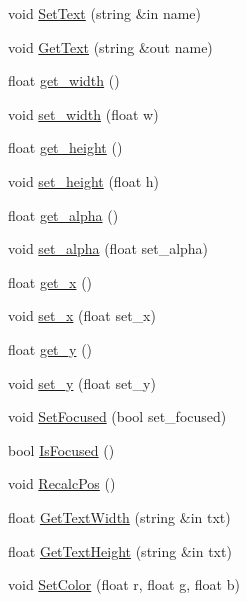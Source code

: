 \begin{DoxyCompactItemize}
\item 
void \hyperlink{class_g_u_i_calendar_a0a48b35472a2d11647c7276c0a759d38}{Set\+Text} (string \&in name)
\item 
void \hyperlink{class_g_u_i_calendar_aca1da814cb8b7bb1127e59122b2ccca1}{Get\+Text} (string \&out name)
\item 
float \hyperlink{class_g_u_i_calendar_ad9aa4a60b149bc5e494958a20e10b9b7}{get\+\_\+width} ()
\item 
void \hyperlink{class_g_u_i_calendar_a18df1a21c9f68e8e3bb0be37e5ac5bf9}{set\+\_\+width} (float w)
\item 
float \hyperlink{class_g_u_i_calendar_ab62fe827f7ec1df658cca65268fb37c6}{get\+\_\+height} ()
\item 
void \hyperlink{class_g_u_i_calendar_a7788bc4ef045da50547cf831fc8e6b51}{set\+\_\+height} (float h)
\item 
float \hyperlink{class_g_u_i_calendar_ae2ffe7ea45c68a0c5e74e4320fbff7a2}{get\+\_\+alpha} ()
\item 
void \hyperlink{class_g_u_i_calendar_afe9ab4803b0d929a3b8b92214b99a952}{set\+\_\+alpha} (float set\+\_\+alpha)
\item 
float \hyperlink{class_g_u_i_calendar_a120b253c9ce3e08af0f5c7a2bd91e617}{get\+\_\+x} ()
\item 
void \hyperlink{class_g_u_i_calendar_abca879f6c1026d9a0fee40996c50f993}{set\+\_\+x} (float set\+\_\+x)
\item 
float \hyperlink{class_g_u_i_calendar_a9d4c8d554e880be140d918cd3448c20c}{get\+\_\+y} ()
\item 
void \hyperlink{class_g_u_i_calendar_a3f2449ec43fa0005c1f8ce0d4be5d309}{set\+\_\+y} (float set\+\_\+y)
\item 
void \hyperlink{class_g_u_i_calendar_ad74701164732d122776bbf705f5b9417}{Set\+Focused} (bool set\+\_\+focused)
\item 
bool \hyperlink{class_g_u_i_calendar_aeba95b85a6b35c8cf6ebbede984719d4}{Is\+Focused} ()
\item 
void \hyperlink{class_g_u_i_calendar_ac1678b2d98311a54578745c173868b72}{Recalc\+Pos} ()
\item 
float \hyperlink{class_g_u_i_calendar_ae4aee018f624f73f0038255b7254b50d}{Get\+Text\+Width} (string \&in txt)
\item 
float \hyperlink{class_g_u_i_calendar_a8f8326ea981b8ef7c81fbd87e014bdbb}{Get\+Text\+Height} (string \&in txt)
\item 
void \hyperlink{class_g_u_i_calendar_acc8d2ad196d173e3c49ab05578d600a3}{Set\+Color} (float r, float g, float b)

\end{DoxyCompactItemize}
